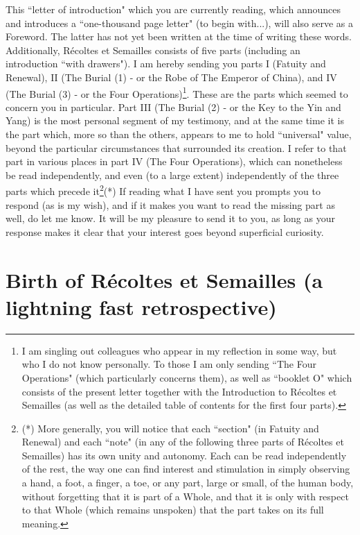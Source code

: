 This ``letter of introduction" which you are currently reading, which announces and introduces a ``one-thousand page letter" (to begin with...), will also serve as a Foreword. The latter has not yet been written at the time of writing these words. Additionally, R\'ecoltes et Semailles consists of five parts (including an introduction ``with drawers"). I am hereby sending you parts I (Fatuity and Renewal), II (The Burial (1) - or the Robe of The Emperor of China), and IV (The Burial (3) - or the Four Operations)\footnote{I am singling out colleagues who appear in my reflection in some way, but who I do not know personally. To those I am only sending ``The Four Operations" (which particularly concerns them), as well as ``booklet O" which consists of the present letter together with the Introduction to R\'ecoltes et Semailles (as well as the detailed table of contents for the first four parts).}. These are the parts which seemed to concern you in particular. Part III (The Burial (2) - or the Key to the Yin and Yang) is the most personal segment of my testimony, and at the same time it is the part which, more so than the others, appears to me to hold ``universal" value, beyond the particular circumstances that surrounded its creation. I refer to that part in various places in part IV (The Four Operations), which can nonetheless be read independently, and even (to a large extent) independently of the three parts which precede it\footnote{(*) More generally, you will notice that each ``section" (in Fatuity and Renewal) and each ``note" (in any of the following three parts of R\'ecoltes et Semailles) has its own unity and autonomy. Each can be read independently of the rest, the way one can find interest and stimulation in simply observing a hand, a foot, a finger, a toe, or any part, large or small, of the human body, without forgetting that it is part of a Whole, and that it is only with respect to that Whole (which remains unspoken) that the part takes on its full meaning.}(*) If reading what I have sent you prompts you to respond (as is my wish), and if it makes you want to read the missing part as well, do let me know. It will be my pleasure to send it to you, as long as your response makes it clear that your interest goes beyond superficial curiosity.

\section{Birth of R\'ecoltes et Semailles (a lightning fast retrospective)}

